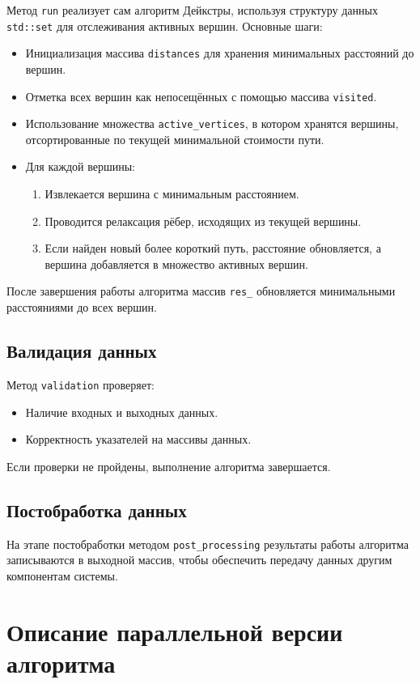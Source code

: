 \documentclass[a4paper,14pt]{extarticle}
\begin{document}
Метод \texttt{run} реализует сам алгоритм Дейкстры, используя структуру данных \texttt{std::set} для отслеживания активных вершин. Основные шаги:
\begin{itemize}
    \item Инициализация массива \texttt{distances} для хранения минимальных расстояний до вершин.
    \item Отметка всех вершин как непосещённых с помощью массива \texttt{visited}.
    \item Использование множества \texttt{active\_vertices}, в котором хранятся вершины, отсортированные по текущей минимальной стоимости пути.
\item Для каждой вершины:
    \begin{enumerate}
        \item Извлекается вершина с минимальным расстоянием.
        \item Проводится релаксация рёбер, исходящих из текущей вершины.
        \item Если найден новый более короткий путь, расстояние обновляется, а вершина добавляется в множество активных вершин.
    \end{enumerate}
\end{itemize}
После завершения работы алгоритма массив \texttt{res\_} обновляется минимальными расстояниями до всех вершин.

\subsection*{Валидация данных}

Метод \texttt{validation} проверяет:
\begin{itemize}
    \item Наличие входных и выходных данных.
    \item Корректность указателей на массивы данных.
\end{itemize}
Если проверки не пройдены, выполнение алгоритма завершается.

\subsection*{Постобработка данных}

На этапе постобработки методом \texttt{post\_processing} результаты работы алгоритма записываются в выходной массив, чтобы обеспечить передачу данных другим компонентам системы.

\section*{Описание параллельной версии алгоритма}
\end{document}
